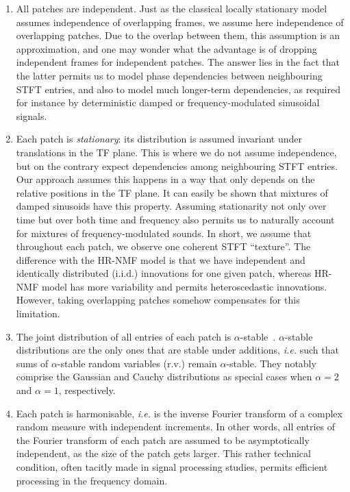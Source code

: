 \begin{enumerate}[leftmargin=0cm,itemindent=.5cm,labelsep=0cm,align=left]
\item All patches are independent. Just as the classical locally stationary
model~\cite{GP-USS-TSP} assumes independence of overlapping frames,
we assume here independence of overlapping patches. Due to the
overlap between them, this assumption is an approximation,
and one may wonder what the advantage is of dropping independent frames
for independent patches. The answer lies in the fact that the latter
permits us to model phase dependencies between neighbouring STFT entries,
and also to model much longer-term dependencies, as required for instance
by deterministic damped or frequency-modulated sinusoidal signals.\label{enu:assumption_independent_patches}
\item Each patch is \emph{stationary}: its distribution
is assumed invariant under translations in the TF plane. This is where we do not assume independence, but on the contrary expect dependencies among neighbouring STFT entries. Our approach assumes this happens in a way that only depends on the relative positions in
the TF plane. It can easily be shown that mixtures of
damped sinusoids have this property. Assuming stationarity not only over time but over both time and frequency
also permits us to naturally account for mixtures of frequency-modulated
sounds. In short, we assume that throughout each patch, we observe
one coherent STFT ``texture''. The difference with the HR-NMF model is that we have independent and identically
distributed (i.i.d.) innovations for one given patch, whereas HR-NMF model has more variability and permits heteroscedastic innovations. However, taking overlapping patches somehow compensates for
this limitation.\label{enu:assumption_stationary}
\item The joint distribution of all entries of each patch is $\alpha$-stable~\cite{samoradnitsky1994stable}.
$\alpha$-stable distributions are the only ones that are stable under additions, \emph{i.e.} such that
sums of $\alpha$-stable random variables (r.v.) remain $\alpha$-stable.
They notably comprise the Gaussian and Cauchy distributions as special
cases when $\alpha=2$ and $\alpha=1$, respectively.\label{enu:assumption_alpha_stable}
\item Each patch is harmonisable, \emph{i.e.} is the inverse Fourier
transform of a complex random measure with independent increments.
In other words, all entries of the Fourier transform of each patch
are assumed to be asymptotically independent, as the size of the patch
gets larger. This rather technical condition, often tacitly made in
signal processing studies, permits efficient processing in the frequency
domain.\label{enu:assumption_harmonisable}
\end{enumerate}

